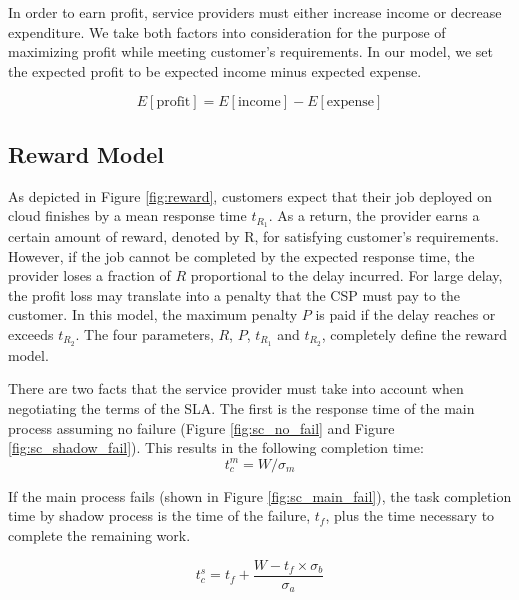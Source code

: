In order to earn profit, service providers must either increase
income or decrease expenditure. We take both factors into
consideration for the purpose of maximizing profit while meeting
customer's requirements. In our model, we set the expected profit to be
expected income minus expected expense.

\begin{equation}
E[\text{profit}]=E[\text{income}]-E[\text{expense}]
\end{equation}

\subsection{Reward Model}
\label{sla_reward_model}

As depicted in Figure \ref{fig:reward}, customers expect that their
job deployed on cloud finishes by a mean response time $t_{R_1}$.  As a
return, the provider earns a certain amount of reward, denoted by R,
for satisfying customer's requirements. However, if the job cannot be
completed by the expected response time, the provider loses a fraction of $R$
proportional to the delay incurred. For large delay, the profit loss may translate into a penalty that the CSP must pay to the customer. In this model, the maximum penalty $P$ is paid if the
delay reaches or exceeds $t_{R_2}$. The four
parameters, $R$, $P$, $t_{R_1}$ and
$t_{R_2}$, completely define the reward model.

There are two facts that the service provider must take into account
when negotiating the terms of the SLA. The first is the response time
of the main process assuming no failure (Figure
\ref{fig:sc_no_fail} and Figure \ref{fig:sc_shadow_fail}). This
results in the following completion time:
\begin{equation}
t_c^m=W/\sigma_m
\label{eq:tcm}
\end{equation}

If the main process fails (shown in Figure \ref{fig:sc_main_fail}), the
task completion time by shadow process is the time of the failure,
$t_f$, plus the time necessary to complete the remaining work.

\begin{equation}
t_c^s=t_f+\frac{W-t_f \times \sigma_b}{\sigma_a}
\label{eq:tcs}
\end{equation}


